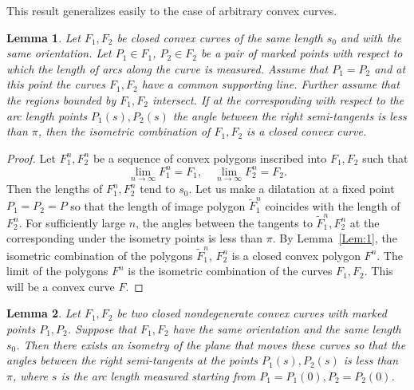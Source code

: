 \documentclass[11pt,oneside]{amsart}
\theoremstyle{theorem}
\newtheorem{lemma}{Lemma}
\theoremstyle{definition}
\theoremstyle{remark}
\begin{document}
This result generalizes easily to the case of arbitrary convex curves.

\begin{lemma}
\label{Lem:2}
Let $F_1, F_2$ be closed convex curves of the same length $s_0$ and with the same orientation. Let $P_1 \in F_1$, $P_2 \in F_2$ be a pair of marked points with respect to which the length of arcs along the curve is measured. Assume that $P_1 = P_2$ and at this point the curves $F_1, F_2$ have a common supporting line. Further assume that the regions bounded by $F_1, F_2$ intersect. If at the corresponding with respect to the arc length points $P_1(s), P_2(s)$ the angle between the right semi-tangents is less than $\pi$, then the isometric combination of $F_1, F_2$ is a closed convex curve.  
\end{lemma}

\begin{proof}
Let $F_1^n ,F_2^n$ be a sequence of convex polygons inscribed into $F_1, F_2$ such that
\[
\lim_{n \to \infty} F_1^n = F_1, \quad \lim_{n \to \infty} F_2^n = F_2.
\]
Then the lengths of $F_1^n, F_2^n$ tend to $s_0$. Let us make a dilatation at a fixed point $P_1 = P_2 = P$ so that the length of image polygon $\tilde F_1^n$ coincides with the length of $F_2^n$. For sufficiently large $n$, the angles between the tangents to $\tilde F_1^n, F_2^n$ at the corresponding under the isometry points is less than $\pi$. By Lemma~\ref{Lem:1}, the isometric combination of the polygons $\tilde F_1^n$, $F_2^n$ is a closed convex polygon $F^n$. The limit of the polygons $F^n$ is the isometric combination of the curves $F_1, F_2$. This will be a convex curve $F$.   
\end{proof}

\begin{lemma}
\label{Lem:3}
Let $F_1, F_2$ be two closed nondegenerate convex curves with marked points $P_1, P_2$. Suppose that $F_1, F_2$ have the same orientation and the same length $s_0$. Then there exists an isometry of the plane that moves these curves so that the angles between the right semi-tangents at the points $P_1(s), P_2(s)$ is less than $\pi$, where $s$ is the arc length measured starting from $P_1=P_1(0), P_2=P_2(0)$. 
\end{lemma}
\end{document}
